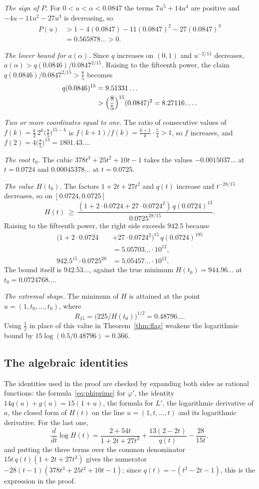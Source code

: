 \emph{The sign of $P$.} For $0<u<\alpha<0.0847$ the terms $7u^5+14u^4$ are
positive and $-4u-11u^2-27u^3$ is decreasing, so
\begin{align*}
 P(u)&>1-4(0.0847)-11(0.0847)^2-27(0.0847)^3\\
 &=0.565878\ldots>0 .
\end{align*}

\emph{The lower bound for $a(\alpha)$.} Since $q$ increases on $(0,1)$ and
$u^{-2/15}$ decreases, $a(\alpha)>q(0.0846)/0.0847^{2/15}$. Raising to the
fifteenth power, the claim $q(0.0846)/0.0847^{2/15}>\frac85$ becomes
\begin{align*}
 q(0.0846)^{15}&=9.51331\ldots\\
 &>\Bigl(\frac85\Bigr)^{15}(0.0847)^2=8.27116\ldots .
\end{align*}

\emph{Two or more coordinates equal to one.} The ratio of consecutive
values of $f(k)=\frac k2\,2^k\bigl(\frac85\bigr)^{15-k}$ is
$f(k+1)/f(k)=\frac{k+1}k\cdot\frac54>1$, so $f$ increases, and
$f(2)=4\bigl(\frac85\bigr)^{13}=1801.43\ldots$.

\emph{The root $t_0$.} The cubic $378t^3+25t^2+10t-1$ takes the values
$-0.0015037\ldots$ at $t=0.0724$ and $0.00045378\ldots$ at $t=0.0725$.

\emph{The value $H(t_0)$.} The factors $1+2t+27t^2$ and $q(t)$ increase
and $t^{-28/15}$ decreases, so on $[0.0724,0.0725]$
\[
 H(t)\ \ge\ \frac{(1+2\cdot0.0724+27\cdot0.0724^2)\,q(0.0724)^{13}}
 {0.0725^{28/15}} .
\]
Raising to the fifteenth power, the right side exceeds $942.5$ because
\begin{align*}
 (1+2\cdot0.0724&+27\cdot0.0724^2)^{15}\,q(0.0724)^{195}\\
 &=5.05703\ldots\cdot10^{12},\\
 942.5^{15}\cdot0.0725^{28}&=5.05457\ldots\cdot10^{12}.
\end{align*}
The bound itself is $942.53\ldots$, against the true minimum
$H(t_0)=944.96\ldots$ at $t_0=0.0724768\ldots$.

\emph{The extremal shape.} The minimum of $H$ is attained at the point
$u=(1,t_0,\dots,t_0)$, where
\[
 R_{15}=\bigl(225/H(t_0)\bigr)^{1/2}=0.48796\ldots .
\]
Using $\frac12$ in place of this value in Theorem~\ref{thm:flag} weakens
the logarithmic bound by $15\log(0.5/0.48796)=0.366$.

\subsection{The algebraic identities}

The identities used in the proof are checked by expanding both sides as
rational functions: the formula~\eqref{eq:phiprime} for $\varphi'$, the
identity $14q(u)+g(u)=15(1+u)$, the formula for $L'$, the logarithmic
derivative of $a$, the closed form of $H(t)$ on the line
$u=(1,t,\dots,t)$ and its logarithmic derivative. For the last one,
\[
 \frac{d}{dt}\log H(t)=\frac{2+54t}{1+2t+27t^2}+\frac{13(2-2t)}{q(t)}
 -\frac{28}{15t},
\]
and putting the three terms over the common denominator
$15t\,q(t)(1+2t+27t^2)$ gives the numerator
$-28(t-1)(378t^3+25t^2+10t-1)$; since $q(t)=-(t^2-2t-1)$, this is the
expression in the proof.
